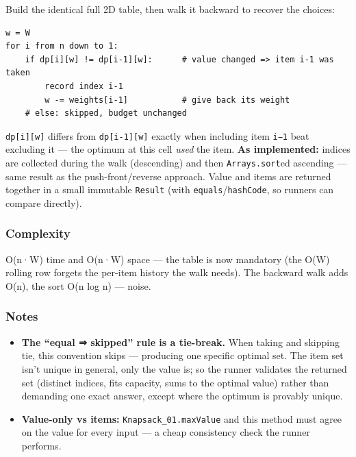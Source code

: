 \documentclass[
  10pt,
  letterpaper,
  onecolumn]{article}
\providecommand{\tightlist}{%
  \setlength{\itemsep}{0pt}\setlength{\parskip}{0pt}}
\begin{document}
Build the identical full 2D table, then walk it backward to recover the
choices:

\begin{verbatim}
w = W
for i from n down to 1:
    if dp[i][w] != dp[i-1][w]:      # value changed => item i-1 was taken
        record index i-1
        w -= weights[i-1]           # give back its weight
    # else: skipped, budget unchanged
\end{verbatim}

\texttt{dp{[}i{]}{[}w{]}} differs from \texttt{dp{[}i-1{]}{[}w{]}}
exactly when including item \texttt{i−1} beat excluding it --- the
optimum at this cell \emph{used} the item. \textbf{As implemented:}
indices are collected during the walk (descending) and then
\texttt{Arrays.sort}ed ascending --- same result as the
push-front/reverse approach. Value and items are returned together in a
small immutable \texttt{Result} (with \texttt{equals}/\texttt{hashCode},
so runners can compare directly).

\hypertarget{complexity-15}{%
\subsubsection{Complexity}\label{complexity-15}}

O(n·W) time and O(n·W) space --- the table is now mandatory (the O(W)
rolling row forgets the per-item history the walk needs). The backward
walk adds O(n), the sort O(n log n) --- noise.

\hypertarget{notes-13}{%
\subsubsection{Notes}\label{notes-13}}

\begin{itemize}
\tightlist
\item
  \textbf{The ``equal ⇒ skipped'' rule is a tie-break.} When taking and
  skipping tie, this convention skips --- producing one specific optimal
  set. The item set isn't unique in general, only the value is; so the
  runner validates the returned set (distinct indices, fits capacity,
  sums to the optimal value) rather than demanding one exact answer,
  except where the optimum is provably unique.
\item
  \textbf{Value-only vs items:} \texttt{Knapsack\_01.maxValue} and this
  method must agree on the value for every input --- a cheap consistency
  check the runner performs.
\end{itemize}
\end{document}
